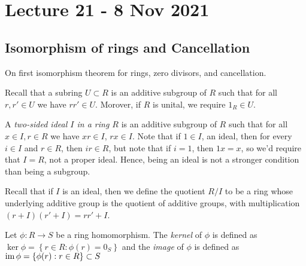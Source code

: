 \section{Lecture 21 - 8 Nov 2021}
\subsection{Isomorphism of rings and Cancellation}
On first isomorphism theorem for rings, zero divisors, and cancellation.

Recall that a subring $U\subset R$ is an additive subgroup of $R$ such that for all
$r,r'\in U$ we have $rr'\in U$. Morover, if $R$ is unital, we require $1_R\in U$. 

A \emph{two-sided ideal $I$ in a ring $R$ } is an additive subgroup of $R$ such that for
all $x\in I, r\in R$ we have $xr\in I$, $rx\in I$. Note that if $1\in I$, an ideal, then
for every $i\in I$ and $r\in R$, then $ir\in R$, but note that if $i=1$, then $1x=x$, so
we'd require that $I=R$, not a proper ideal. Hence, being an ideal is not a stronger
condition than being a subgroup.

Recall that if $I$ is an ideal, then we define the quotient $R/I$ to be a ring whose
underlying additive group is the quotient of additive groups, with multiplication
$(r+I)(r'+I) = rr'+I$.

\begin{definition}
  Let $\phi:R\to S$ be a ring homomorphism. The \emph{kernel} of $\phi$ is defined as
  $\ker\phi=\left\{ r\in R : \phi(r)=0_S \right\}$ and the \emph{image} of $\phi$ is
  defined as $\operatorname{im}\phi=\left\{ \phi(r) : r\in R \right\}\subset S$
\end{definition}

